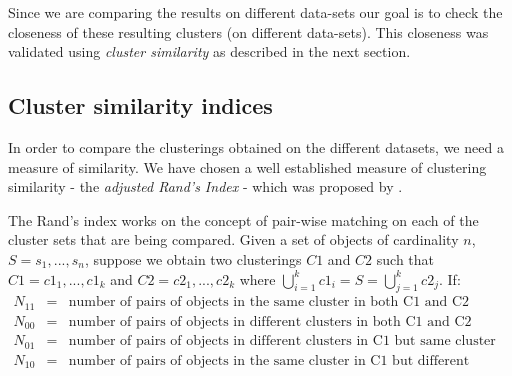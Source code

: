 Since we are comparing the results on different data-sets our goal is to check the closeness of these resulting clusters (on different data-sets). This closeness was validated using \textit{cluster similarity} as described in the next section.

\subsection{Cluster similarity indices}
In order to compare the clusterings obtained on the different datasets, we need a measure of similarity. We have chosen a well established measure of clustering similarity - the \textit{adjusted Rand's Index} - which was proposed by \citet{hubert85comparing}. 

The Rand's index works on the concept of pair-wise matching on each of the cluster sets that are being compared. Given a set of objects of cardinality $n$, $S = {s_1, . . . , s_n}$, suppose we obtain two clusterings $C1$ and $C2$ such that $C1 = {c1_1, . . . , c1_k}$ and $C2 = {c2_1, . . . , c2_k }$ where $\bigcup_{i=1}^{k}c1_{i} = S = \bigcup_{j=1}^{k}c2_{j}$. If:
\begin{eqnarray*}
N_{11} & = & \mbox{number of pairs of objects in the same cluster in both C1 and C2}\nonumber\\
N_{00} & = & \mbox{number of pairs of objects in different clusters in both C1 and C2}\nonumber\\
N_{01} & = & \mbox{number of pairs of objects in different clusters in C1 but same cluster in C2}\nonumber\\
N_{10} & = & \mbox{number of pairs of objects in the same cluster in C1 but different clusters in C2}\nonumber\\
\end{eqnarray*}

